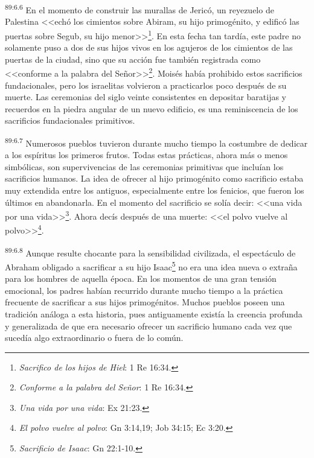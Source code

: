 \documentclass[twoside, 11pt]{book}
\begin{document}
\par
\textsuperscript{89:6.6} En el momento de construir las murallas de Jericó, un reyezuelo de Palestina <<echó los cimientos sobre Abiram, su hijo primogénito, y edificó las puertas sobre Segub, su hijo menor>>\footnote{\textit{Sacrifico de los hijos de Hiel}: 1 Re 16:34.}. En esta fecha tan tardía, este padre no solamente puso a dos de sus hijos vivos en los agujeros de los cimientos de las puertas de la ciudad, sino que su acción fue también registrada como <<conforme a la palabra del Señor>>\footnote{\textit{Conforme a la palabra del Señor}: 1 Re 16:34.}. Moisés había prohibido estos sacrificios fundacionales, pero los israelitas volvieron a practicarlos poco después de su muerte. Las ceremonias del siglo veinte consistentes en depositar baratijas y recuerdos en la piedra angular de un nuevo edificio, es una reminiscencia de los sacrificios fundacionales primitivos.

\par
\textsuperscript{89:6.7} Numerosos pueblos tuvieron durante mucho tiempo la costumbre de dedicar a los espíritus los primeros frutos. Todas estas prácticas, ahora más o menos simbólicas, son supervivencias de las ceremonias primitivas que incluían los sacrificios humanos. La idea de ofrecer al hijo primogénito como sacrificio estaba muy extendida entre los antiguos, especialmente entre los fenicios, que fueron los últimos en abandonarla. En el momento del sacrificio se solía decir: <<una vida por una vida>>\footnote{\textit{Una vida por una vida}: Ex 21:23.}. Ahora decís después de una muerte: <<el polvo vuelve al polvo>>\footnote{\textit{El polvo vuelve al polvo}: Gn 3:14,19; Job 34:15; Ec 3:20.}.

\par
\textsuperscript{89:6.8} Aunque resulte chocante para la sensibilidad civilizada, el espectáculo de Abraham obligado a sacrificar a su hijo Isaac\footnote{\textit{Sacrificio de Isaac}: Gn 22:1-10.} no era una idea nueva o extraña para los hombres de aquella época. En los momentos de una gran tensión emocional, los padres habían recurrido durante mucho tiempo a la práctica frecuente de sacrificar a sus hijos primogénitos. Muchos pueblos poseen una tradición análoga a esta historia, pues antiguamente existía la creencia profunda y generalizada de que era necesario ofrecer un sacrificio humano cada vez que sucedía algo extraordinario o fuera de lo común.
\end{document}
